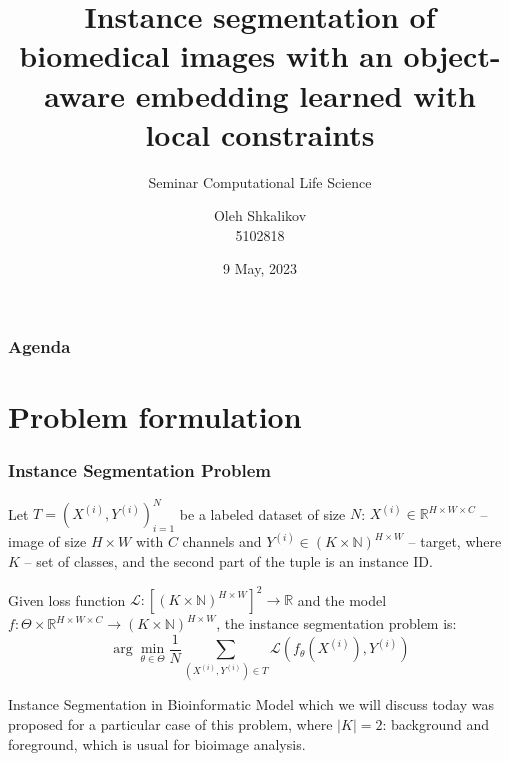 \documentclass{beamer}
\title[Instance segmentation]{Instance segmentation of biomedical images with an object-aware
embedding learned with local constraints}
\subtitle{Seminar Computational Life Science}
\author[Oleh Shkalikov]{Oleh Shkalikov \texorpdfstring{\\ 5102818}{}}
\institute[TU Dresden]{TU Dresden, Computer Science Faculty}
\date{9 May, 2023}
\begin{document}
\frame{\titlepage}

\begin{frame}
    \frametitle{Agenda}
    \tableofcontents
\end{frame}

\section{Problem formulation}

\begin{frame}
    \frametitle{Instance Segmentation Problem}

    Let $T = \left( X^{(i)}, Y^{(i)} \right)_{i=1}^N$ be a labeled dataset of size $N$:
    $X^{(i)} \in \mathbb{R}^{H \times W \times C}$ -- image of size $H \times W$ with $C$ channels
    and $Y^{(i)} \in (K \times \mathbb{N})^{H \times W}$ -- target, where
    $K$ -- set of classes, and the second part of the tuple is an instance ID.

    Given loss function $\mathcal{L}:
        \left[ (K \times {\mathbb{N}})^{H \times W} \right]^2 \rightarrow \mathbb{R}$
    and the model
    $f: \Theta \times \mathbb{R}^{H \times W \times C} \rightarrow
        (K \times {\mathbb{N}})^{H \times W} $,
    the instance segmentation problem is:
    \[
        \arg \min\limits_{\theta \in \Theta} \frac{1}{N}
        \sum\limits_{\left( X^{(i)}, Y^{(i)} \right) \in T}
        \mathcal{L}\left( f_{\theta}\left( X^{(i)} \right), Y^{(i)} \right)
    \]

    \begin{alertblock}{Instance Segmentation in Bioinformatic}
        Model which we will discuss today was proposed for
        a particular case of this problem, where $|K|=2$: background and
        foreground, which is usual for bioimage analysis.
    \end{alertblock}

\end{frame}
\end{document}
